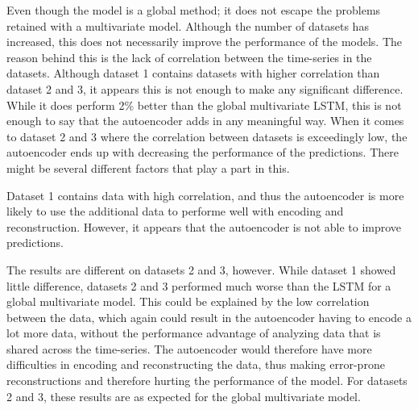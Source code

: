 Even though the model is a global method; it does not escape the problems retained with a multivariate model.
Although the number of datasets has increased, this does not necessarily improve the performance of the models.
The reason behind this is the lack of correlation between the time-series in the datasets.
Although dataset 1 contains datasets with higher correlation than dataset 2 and 3, it appears this is not enough to make any significant difference.
While it does perform 2\% better than the global multivariate LSTM, this is not enough to say that the autoencoder adds
in any meaningful way.
When it comes to dataset 2 and 3 where the correlation between datasets is exceedingly low, the autoencoder ends up with decreasing the performance of the predictions.
There might be several different factors that play a part in this.

Dataset 1 contains data with high correlation, and thus the autoencoder is more likely to use the additional data to performe well with encoding and reconstruction.
However, it appears that the autoencoder is not able to improve predictions.


The results are different on datasets 2 and 3, however.
While dataset 1 showed little difference, datasets 2 and 3 performed much worse than the LSTM for a global multivariate model.
This could be explained by the low correlation between the data, which again could result in the autoencoder having to encode a lot more data,
without the performance advantage of analyzing data that is shared across the time-series.
The autoencoder would therefore have more difficulties in encoding and reconstructing the data,
thus making error-prone reconstructions and therefore hurting the performance of the model.
For datasets 2 and 3, these results are as expected for the global multivariate model.















